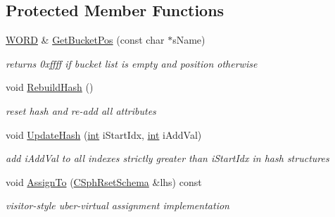 \subsection*{Protected Member Functions}
\begin{DoxyCompactItemize}
\item 
\hyperlink{sphinxstd_8h_a197942eefa7db30960ae396d68339b97}{W\-O\-R\-D} \& \hyperlink{classCSphSchema_a7a06e51c2994c8aa4e1e1d1a959c178c}{Get\-Bucket\-Pos} (const char $\ast$s\-Name)
\begin{DoxyCompactList}\small\item\em returns 0xffff if bucket list is empty and position otherwise \end{DoxyCompactList}\item 
void \hyperlink{classCSphSchema_a390c329fef233bb45e1c5035a93459b9}{Rebuild\-Hash} ()
\begin{DoxyCompactList}\small\item\em reset hash and re-\/add all attributes \end{DoxyCompactList}\item 
void \hyperlink{classCSphSchema_afcde9b749bec5e98140e8b84ec2b8bfc}{Update\-Hash} (\hyperlink{sphinxexpr_8cpp_a4a26e8f9cb8b736e0c4cbf4d16de985e}{int} i\-Start\-Idx, \hyperlink{sphinxexpr_8cpp_a4a26e8f9cb8b736e0c4cbf4d16de985e}{int} i\-Add\-Val)
\begin{DoxyCompactList}\small\item\em add i\-Add\-Val to all indexes strictly greater than i\-Start\-Idx in hash structures \end{DoxyCompactList}\item 
void \hyperlink{classCSphSchema_a807d4ab581aafd1b94c36901812d26e7}{Assign\-To} (\hyperlink{classCSphRsetSchema}{C\-Sph\-Rset\-Schema} \&lhs) const 
\begin{DoxyCompactList}\small\item\em visitor-\/style uber-\/virtual assignment implementation \end{DoxyCompactList}\end{DoxyCompactItemize}
